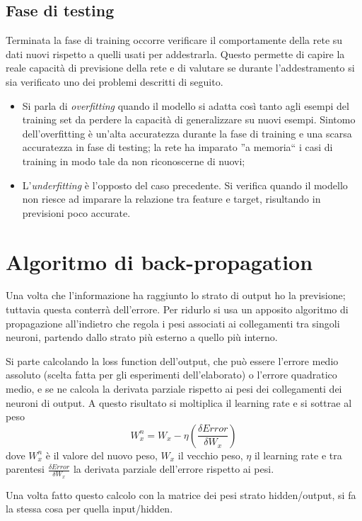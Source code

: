 \documentclass[12pt]{report}
\begin{document}
\subsection{Fase di testing}
Terminata la fase di training occorre verificare il comportamente della rete su dati nuovi rispetto a quelli usati per addestrarla. Questo permette di capire la reale capacità di previsione della rete e di valutare se durante l'addestramento si sia verificato uno dei problemi descritti di seguito.
\begin{itemize}
\item{Si parla di \textit{overfitting} quando il modello si adatta così tanto agli esempi del training set da perdere la capacità di generalizzare su nuovi esempi. Sintomo dell'overfitting è un'alta accuratezza durante la fase di training e una scarsa accuratezza in fase di testing; la rete ha imparato ''a memoria`` i casi di training in modo tale da non riconoscerne di nuovi};
\item{L'\textit{underfitting} è l'opposto del caso precedente. Si verifica quando il modello non riesce ad imparare la relazione tra feature e target, risultando in previsioni poco accurate}.
\end{itemize}

\section{Algoritmo di back-propagation}\label{backprop}
Una volta che l’informazione ha raggiunto lo strato di output ho la previsione; tuttavia questa conterrà dell’errore. Per ridurlo si usa un apposito algoritmo di propagazione all’indietro che regola i pesi associati ai collegamenti tra singoli neuroni, partendo dallo strato più esterno a quello più interno.

Si parte calcolando la loss function dell’output, che può essere l’errore medio assoluto (scelta fatta per gli esperimenti dell'elaborato) o l’errore quadratico medio, e se ne calcola la derivata parziale rispetto ai pesi dei collegamenti dei neuroni di output. A questo risultato si moltiplica il learning rate e si sottrae al peso $$W^n_x = W_x - \eta \left(\frac{\delta Error}{\delta W_x}\right)$$ dove $W^n_x$ è il valore del nuovo peso, $W_x$ il vecchio peso, $\eta$ il learning rate e tra parentesi $\frac{\delta Error}{\delta W_x}$ la derivata parziale dell'errore rispetto ai pesi. 

Una volta fatto questo calcolo con la matrice dei pesi strato hidden/output, si fa la stessa cosa per quella input/hidden.
\end{document}
